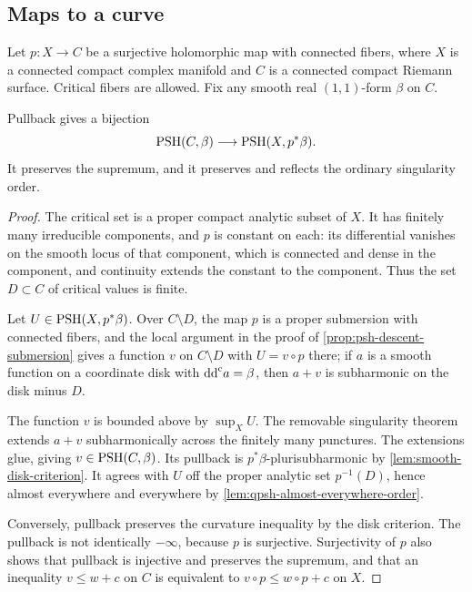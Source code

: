 \subsection{Maps to a curve}
\label{subsec:curve-map-critical-fibers}

Let $p\colon X\to C$ be a surjective holomorphic map with connected
fibers, where $X$ is a connected compact complex manifold and $C$
is a connected compact Riemann surface.
Critical fibers are allowed. Fix any smooth real $(1,1)$-form
$\beta$ on $C$.

\begin{proposition}\label{curve-map:potential-descent}
Pullback gives a bijection
\[
 \mathrm{PSH}(C,\beta)\longrightarrow\mathrm{PSH}(X,p^*\beta).
\]
It preserves the supremum, and it preserves and reflects the
ordinary singularity order.
\end{proposition}
\begin{proof}
The critical set is a proper compact analytic subset of $X$.
It has finitely many irreducible components, and $p$ is constant
on each: its differential vanishes on the smooth locus of that
component, which is connected and dense in the component, and
continuity extends the constant to the component.
Thus the set $D\subset C$ of critical values is finite.

Let $U\in\mathrm{PSH}(X,p^*\beta)$. Over $C\setminus D$, the map $p$ is a
proper submersion with connected fibers, and the local argument in
the proof of \cref{prop:psh-descent-submersion} gives a function
$v$ on $C\setminus D$ with $U=v\circ p$ there; if $a$ is a smooth
function on a coordinate disk with $\mathrm{dd}^{\mathrm{c}} a=\beta$, then $a+v$ is
subharmonic on the disk minus $D$.

The function $v$ is bounded above by $\sup_XU$. The removable
singularity theorem extends $a+v$ subharmonically across the
finitely many punctures. The extensions glue, giving
$v\in\mathrm{PSH}(C,\beta)$. Its pullback is $p^*\beta$-plurisubharmonic
by \cref{lem:smooth-disk-criterion}. It agrees with $U$ off the
proper analytic set $p^{-1}(D)$, hence almost everywhere and
everywhere by \cref{lem:qpsh-almost-everywhere-order}.

Conversely, pullback preserves the curvature inequality by the
disk criterion. The pullback is not identically $-\infty$, because
$p$ is surjective. Surjectivity of $p$ also shows that pullback is
injective and preserves the supremum, and that an inequality
$v\leq w+c$ on $C$ is equivalent to $v\circ p\leq w\circ p+c$ on $X$.
\end{proof}


